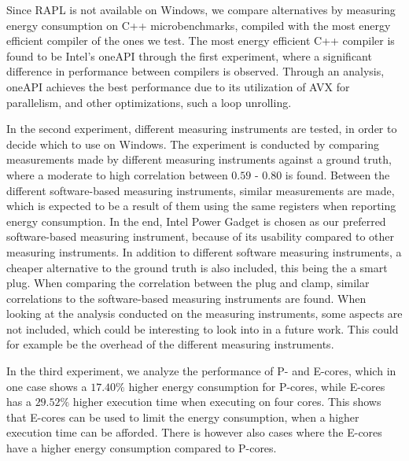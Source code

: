 Since RAPL is not available on Windows, we compare alternatives by measuring energy consumption on C++ microbenchmarks, compiled with the most energy efficient compiler of the ones we test. The most energy efficient C++ compiler is found to be Intel's oneAPI through the first experiment, where a significant difference in performance between compilers is observed. Through an analysis, oneAPI achieves the best performance due to its utilization of AVX for parallelism, and other optimizations, such a loop unrolling.


In the second experiment, different measuring instruments are tested, in order to decide which to use on Windows. The experiment is conducted by comparing measurements made by different measuring instruments against a ground truth, where a moderate to high correlation between $0.59$ - $0.80$ is found. Between the different software-based measuring instruments, similar measurements are made, which is expected to be a result of them using the same registers when reporting energy consumption. In the end, Intel Power Gadget is chosen as our preferred software-based measuring instrument, because of its usability compared to other measuring instruments. In addition to different software measuring instruments, a cheaper alternative to the ground truth is also included, this being the a smart plug. When comparing the correlation between the plug and clamp, similar correlations to the software-based measuring instruments are found. When looking at the analysis conducted on the measuring instruments, some aspects are not included, which could be interesting to look into in a future work. This could for example be the overhead of the different measuring instruments.

In the third experiment, we analyze the performance of P- and E-cores, which in one case shows a $17.40\%$ higher energy consumption for P-cores, while E-cores has a $29.52\%$ higher execution time when executing on four cores. This shows that E-cores can be used to limit the energy consumption, when a higher execution time can be afforded. There is however also cases where the E-cores have a higher energy consumption compared to P-cores.



